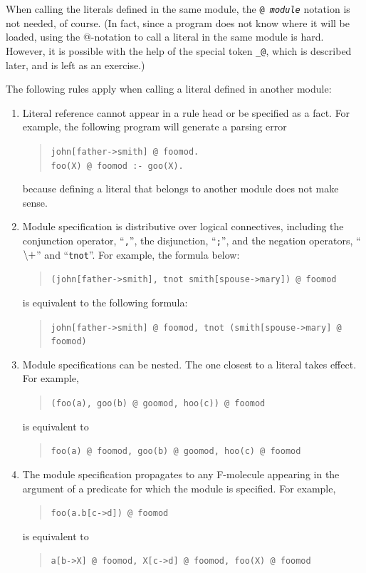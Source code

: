 \documentclass[11pt]{article}
\makeatletter
\newcommand{\thismodule}{{\tt \_@}\xspace}
\newcommand{\NAF}{{$\tt\backslash +$}\xspace}
\makeatother
\begin{document}
When calling the literals defined in the same module, the {\tt @{\it
    module}} notation is not needed, of course. (In fact, since a program
does not know where it will be loaded, using the @-notation to call a
literal in the same module is hard. However, it is possible with the help
of the special token \thismodule, which is described later, and is left
as an exercise.)

The following rules apply when calling a literal defined in another module:
\begin{enumerate}
\item Literal reference cannot appear in a rule head or be specified as
  a fact. For example, the following program will generate
  a parsing error
  \begin{quote}
    \verb|john[father->smith] @ foomod.| \\
    \verb|foo(X) @ foomod :- goo(X).|
  \end{quote}
  because defining a literal that belongs to another module does not make
  sense.
  
\item Module specification is distributive over logical connectives,
  including the conjunction operator, ``\verb|,|'', the disjunction,
  ``\verb|;|'', and the negation operators, ``\NAF'' and
  ``\verb|tnot|''. For example, the formula below:
  \begin{quote}
    \verb|(john[father->smith], tnot smith[spouse->mary]) @ foomod|
  \end{quote}
  is equivalent to the following formula:
  \begin{quote}
    \verb|john[father->smith] @ foomod, tnot (smith[spouse->mary] @ foomod)|
  \end{quote}

\item Module specifications can be nested. The one closest to a literal
  takes effect. For example,
  \begin{quote}
    \verb|(foo(a), goo(b) @ goomod, hoo(c)) @ foomod|
  \end{quote}
  is equivalent to
  \begin{quote}
    \verb|foo(a) @ foomod, goo(b) @ goomod, hoo(c) @ foomod|
  \end{quote}
  
\item The module specification propagates to any F-molecule appearing
  in the argument of a predicate for which the module is
  specified. For example,
  \begin{quote}
    \verb|foo(a.b[c->d]) @ foomod|
  \end{quote}
  is equivalent to
  \begin{quote}
    \verb|a[b->X] @ foomod, X[c->d] @ foomod, foo(X) @ foomod|
  \end{quote}
  

\end{enumerate}
\end{document}
